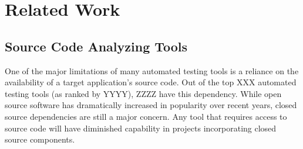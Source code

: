 \section{Related Work}
\label{SEC:related-work}

\subsection{Source Code Analyzing Tools}

One of the major limitations of many automated testing tools is a reliance
on the availability of a target application's source code.  Out of the top
XXX automated testing tools (as ranked by YYYY), ZZZZ have this
dependency. While open source software has dramatically
increased in popularity over recent years, closed source dependencies are
still a major concern.  Any tool that requires access to
source code will have diminished capability in projects incorporating
closed source components.

